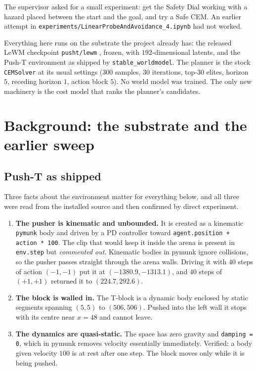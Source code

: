 \documentclass[11pt,a4paper]{article}
\begin{document}
The supervisor asked for a small experiment: get the Safety Dial working with a hazard placed
between the start and the goal, and try a Safe CEM. An earlier attempt in
\texttt{experiments/LinearProbeAndAvoidance\_4.ipynb} had not worked.

Everything here runs on the substrate the project already has: the released LeWM checkpoint
\texttt{pusht/lewm} \parencite{maes2026lewm}, frozen, with $192$-dimensional latents, and the
Push-T environment \parencite{chi2023diffusion} as shipped by \texttt{stable\_worldmodel}. The
planner is the stock \texttt{CEMSolver} at its usual settings ($300$ samples, $30$ iterations,
top-$30$ elites, horizon $5$, receding horizon $1$, action block $5$). No world model was
trained. The only new machinery is the cost model that ranks the planner's candidates.

\section{Background: the substrate and the earlier sweep}

\subsection{Push-T as shipped}

Three facts about the environment matter for everything below, and all three were read from
the installed source and then confirmed by direct experiment.

\begin{enumerate}
  \item \textbf{The pusher is kinematic and unbounded.} It is created as a
    kinematic \texttt{pymunk} body and driven by a PD controller
    toward \texttt{agent.position + action * 100}. The clip that would keep it inside the
    arena is present in \texttt{env.step} but \emph{commented out}. Kinematic bodies in pymunk
    ignore collisions, so the pusher passes straight through the arena walls. Driving it with
    $40$ steps of action $(-1,-1)$ put it at $(-1380.9, -1313.1)$, and $40$ steps of $(+1,+1)$
    returned it to $(224.7, 292.6)$.
  \item \textbf{The block is walled in.} The T-block is a dynamic body enclosed by static
    segments spanning $(5,5)$ to $(506,506)$. Pushed into the left wall it stops with its
    centre near $x = 48$ and cannot leave.
  \item \textbf{The dynamics are quasi-static.} The space has zero gravity and
    \texttt{damping = 0}, which in pymunk removes velocity essentially immediately. Verified:
    a body given velocity $100$ is at rest after one step. The block moves only while it is
    being pushed.
\end{enumerate}
\end{document}
